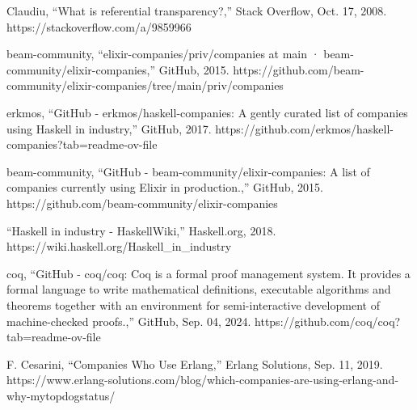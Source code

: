 \documentclass[12pt]{report} %
\begin{document}
\begin{singlespace}
\begin{thebibliography}{}
             Claudiu, “What is referential transparency?,” Stack Overflow, Oct. 17, 2008. https://stackoverflow.com/a/9859966

             beam-community, “elixir-companies/priv/companies at main · beam-community/elixir-companies,” GitHub, 2015. https://github.com/beam-community/elixir-companies/tree/main/priv/companies

             erkmos, “GitHub - erkmos/haskell-companies: A gently curated list of companies using Haskell in industry,” GitHub, 2017. https://github.com/erkmos/haskell-companies?tab=readme-ov-file

             beam-community, “GitHub - beam-community/elixir-companies: A list of companies currently using Elixir in production.,” GitHub, 2015. https://github.com/beam-community/elixir-companies

             “Haskell in industry - HaskellWiki,” Haskell.org, 2018. https://wiki.haskell.org/Haskell\_in\_industry

             coq, “GitHub - coq/coq: Coq is a formal proof management system. It provides a formal language to write mathematical definitions, executable algorithms and theorems together with an environment for semi-interactive development of machine-checked proofs.,” GitHub, Sep. 04, 2024. https://github.com/coq/coq?tab=readme-ov-file

             F. Cesarini, “Companies Who Use Erlang,” Erlang Solutions, Sep. 11, 2019. https://www.erlang-solutions.com/blog/which-companies-are-using-erlang-and-why-mytopdogstatus/

        \end{thebibliography}

    \end{singlespace}

    \appendix
        
    
    
    
\end{document}
